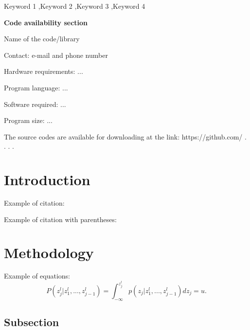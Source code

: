 \documentclass[a4paper,fleqn]{cas-sc}
\begin{document}
\begin{keywords}
Keyword 1 \sep Keyword 2 \sep Keyword 3 \sep Keyword 4
\end{keywords}

\maketitle 

\doublespacing

\textbf{Code availability section}

Name of the code/library

Contact: e-mail and phone number

Hardware requirements: ...

Program language: ...
 
Software required: ...

Program size: ...

The source codes are available for downloading at the link:
https://github.com/ . . . . 

\section{Introduction}
\label{intro}



Example of citation:

\cite{DEFIGUEIREDO2021, Tran1994, JaimeGmezHernndez1990,pardo2003connec3d, hansen2018multiple, CAGEO_2019_mingliang, CAGEO_2004_GSTAT_Slanguage}

Example of citation with parentheses: 

\citep{DEFIGUEIREDO2021, Tran1994, JaimeGmezHernndez1990,pardo2003connec3d, hansen2018multiple, CAGEO_2019_mingliang, CAGEO_2004_GSTAT_Slanguage}

\section{Methodology}

Example of equations:
\begin{equation}
\label{eqn:cumulative_definition}
    P( z_{j}^l |z_{1}^l,...,z_{j-1}^l) = \int_{-\infty}^{z_{j}^l} p(z_j|z_{1}^l,...,z_{j-1}^l) dz_j = u.
\end{equation}


\subsection{Subsection}
\end{document}
